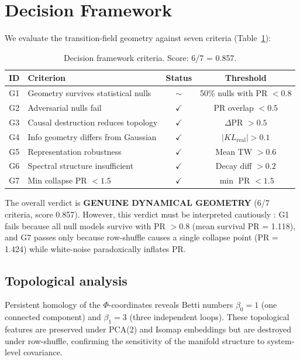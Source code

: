 \documentclass[aip,chaos,showpacs,superscriptaddress,groupedaddress]{revtex4-1}
\begin{document}
\section{Decision Framework}
\label{sec:decision}

We evaluate the transition-field geometry against seven criteria (Table~\ref{tab:criteria}):

\begin{table}[h]
\centering
\caption{Decision framework criteria. Score: 6/7 = 0.857.}
\label{tab:criteria}
\begin{tabular}{clcc}
\toprule
ID & Criterion & Status & Threshold \\
\midrule
G1 & Geometry survives statistical nulls & $\sim$ & 50\% nulls with PR $< 0.8$ \\
G2 & Adversarial nulls fail & $\checkmark$ & PR overlap $< 0.5$ \\
G3 & Causal destruction reduces topology & $\checkmark$ & $\Delta$PR $> 0.5$ \\
G4 & Info geometry differs from Gaussian & $\checkmark$ & $|KL_{\text{real}}| > 0.1$ \\
G5 & Representation robustness & $\checkmark$ & Mean TW $> 0.6$ \\
G6 & Spectral structure insufficient & $\checkmark$ & Decay diff $> 0.2$ \\
G7 & Min collapse PR $< 1.5$ & $\checkmark$ & $\min$ PR $< 1.5$ \\
\bottomrule
\end{tabular}
\end{table}

The overall verdict is \textbf{GENUINE DYNAMICAL GEOMETRY} (6/7 criteria, score 0.857). However, this verdict must be interpreted cautiously \cite{edelman1992biological}: G1 fails because all null models survive with PR $> 0.8$ (mean survival PR = 1.118), and G7 passes only because row-shuffle causes a single collapse point (PR = 1.424) while white-noise paradoxically inflates PR.

\subsection{Topological analysis}
\label{sec:topology}

Persistent homology \cite{carlsson2009topology, edelsbrunner2010computational, zomorodian2005persistent} of the $\Phi$-coordinates reveals Betti numbers $\beta_0 = 1$ (one connected component) and $\beta_1 = 3$ (three independent loops). These topological features are preserved under PCA(2) and Isomap embeddings but are destroyed under row-shuffle, confirming the sensitivity of the manifold structure to system-level covariance.
\end{document}
